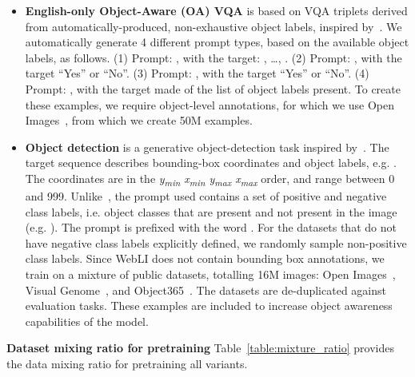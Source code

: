 \begin{itemize}
    , with $[question]$ in language \lang as the target.
    Similarly, we use only English answers here.
    \item \textbf{English-only Object-Aware (OA) VQA} is based on VQA triplets derived from automatically-produced, non-exhaustive object labels, inspired by~\citet{piergiovanni-2022-OApretr}.
    We automatically generate 4 different prompt types, based on the available object labels, as follows. (1) Prompt: , with the target: \obj, \ldots, \objn. (2) Prompt: , with the target ``Yes'' or ``No''. (3) Prompt: , with the target ``Yes'' or ``No''. (4) Prompt: , with the target made of the list of object labels present.
    To create these examples, we require object-level annotations, for which we use Open Images~\citep{kuznetsova2020open}, from which we create 50M examples.
    \item \textbf{Object detection} is a generative object-detection task inspired by~\citet{Chen2022Pix2seqAL,chen2022unified}.
    The target sequence describes bounding-box coordinates and object labels, e.g. .
    The coordinates are in the \textit{y\textsubscript{min} x\textsubscript{min} y\textsubscript{max} x\textsubscript{max}} order, and range between 0 and 999. 
    Unlike~\citet{Chen2022Pix2seqAL}, the prompt used contains a set of positive and negative class labels, i.e. object classes that are present and not present in the image (e.g. ). The prompt is prefixed with the word . For the datasets that do not have negative class labels explicitly defined, we randomly sample non-positive class labels. Since WebLI does not contain bounding box annotations, we train on a mixture of public datasets, totalling 16M images: Open Images~\citep{kuznetsova2020open}, Visual Genome~\citep{krishna-17-visualgenome}, and Object365~\citep{o365}. The datasets are de-duplicated against evaluation tasks. These examples are included to increase object awareness capabilities of the model.
\end{itemize}

\textbf{Dataset mixing ratio for pretraining}
Table~\ref{table:mixture_ratio} provides the data mixing ratio for pretraining all \NAME variants.

